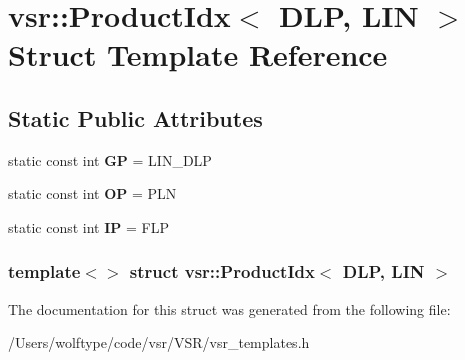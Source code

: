 \hypertarget{structvsr_1_1_product_idx_3_01_d_l_p_00_01_l_i_n_01_4}{\section{vsr\-:\-:Product\-Idx$<$ D\-L\-P, L\-I\-N $>$ Struct Template Reference}
\label{structvsr_1_1_product_idx_3_01_d_l_p_00_01_l_i_n_01_4}
}
\subsection*{Static Public Attributes}
\begin{DoxyCompactItemize}
\item 
\hypertarget{structvsr_1_1_product_idx_3_01_d_l_p_00_01_l_i_n_01_4_afa32a38e4434287122e7048e588262cd}{static const int {\bfseries G\-P} = L\-I\-N\-\_\-\-D\-L\-P}\label{structvsr_1_1_product_idx_3_01_d_l_p_00_01_l_i_n_01_4_afa32a38e4434287122e7048e588262cd}

\item 
\hypertarget{structvsr_1_1_product_idx_3_01_d_l_p_00_01_l_i_n_01_4_a462ecb2bdba0d76ed7f6d4ae07a4ab06}{static const int {\bfseries O\-P} = P\-L\-N}\label{structvsr_1_1_product_idx_3_01_d_l_p_00_01_l_i_n_01_4_a462ecb2bdba0d76ed7f6d4ae07a4ab06}

\item 
\hypertarget{structvsr_1_1_product_idx_3_01_d_l_p_00_01_l_i_n_01_4_aa2d0d5da843063660f3fbd798f20f9b3}{static const int {\bfseries I\-P} = F\-L\-P}\label{structvsr_1_1_product_idx_3_01_d_l_p_00_01_l_i_n_01_4_aa2d0d5da843063660f3fbd798f20f9b3}

\end{DoxyCompactItemize}
\subsubsection*{template$<$$>$ struct vsr\-::\-Product\-Idx$<$ D\-L\-P, L\-I\-N $>$}



The documentation for this struct was generated from the following file\-:\begin{DoxyCompactItemize}
\item 
/\-Users/wolftype/code/vsr/\-V\-S\-R/vsr\-\_\-templates.\-h\end{DoxyCompactItemize}
